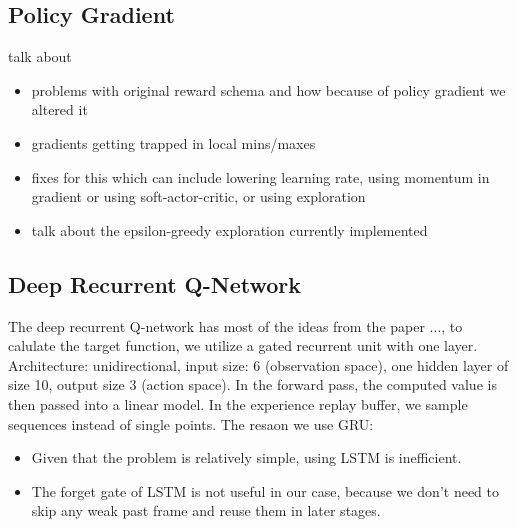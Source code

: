 \documentclass[twoside,11pt]{article}
\begin{document}
\subsection{Policy Gradient}
talk about
\begin{itemize}
\item problems with original reward schema and how because of policy gradient we altered it
\item gradients getting trapped in local mins/maxes
\item fixes for this which can include lowering learning rate, using momentum in gradient or using soft-actor-critic, or using exploration
\item talk about the epsilon-greedy exploration currently implemented
\end{itemize}



\subsection{Deep Recurrent Q-Network}
The deep recurrent Q-network has most of the ideas from the paper ..., to calulate the target function, we utilize a gated recurrent unit with one layer. Architecture: unidirectional, input size: 6 (observation space), one hidden layer of size 10, output size 3 (action space). In the forward pass, the computed value is then passed into a linear model. In the experience replay buffer, we sample sequences instead of single points.
\newline
The resaon we use GRU: \newline
\begin{itemize}
\item Given that the problem is relatively simple, using LSTM is inefficient.
\item The forget gate of LSTM is not useful in our case, because we don't need to skip any weak past frame and reuse them in later stages. 
\end{itemize}

\end{document}
